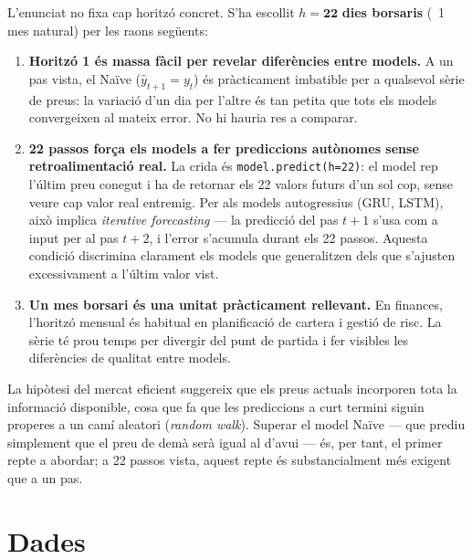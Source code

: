 \documentclass[12pt,a4paper]{article}
\begin{document}
L'enunciat no fixa cap horitzó concret. S'ha escollit $h = \mathbf{22}$ \textbf{dies
borsaris} (~1 mes natural) per les raons següents:

\begin{enumerate}
  \item \textbf{Horitzó 1 és massa fàcil per revelar diferències entre models.}
        A un pas vista, el Naïve ($\hat{y}_{t+1} = y_t$) és pràcticament imbatible
        per a qualsevol sèrie de preus: la variació d'un dia per l'altre és tan petita
        que tots els models convergeixen al mateix error. No hi hauria res a comparar.

  \item \textbf{22 passos força els models a fer prediccions autònomes sense
        retroalimentació real.} La crida és \texttt{model.predict(h=22)}: el model
        rep l'últim preu conegut i ha de retornar els 22 valors futurs d'un sol cop,
        sense veure cap valor real entremig. Per als models autogressius (GRU, LSTM),
        això implica \textit{iterative forecasting} --- la predicció del pas $t+1$
        s'usa com a input per al pas $t+2$, i l'error s'acumula durant els 22 passos.
        Aquesta condició discrimina clarament els models que generalitzen dels que
        s'ajusten excessivament a l'últim valor vist.

  \item \textbf{Un mes borsari és una unitat pràcticament rellevant.}
        En finances, l'horitzó mensual és habitual en planificació de cartera i
        gestió de risc. La sèrie té prou temps per divergir del punt de partida
        i fer visibles les diferències de qualitat entre models.
\end{enumerate}

La hipòtesi del mercat eficient suggereix que els preus actuals incorporen tota la informació
disponible, cosa que fa que les prediccions a curt termini siguin properes a un camí aleatori
(\textit{random walk}). Superar el model Naïve --- que prediu simplement que el preu
de demà serà igual al d'avui --- és, per tant, el primer repte a abordar; a 22 passos
vista, aquest repte és substancialment més exigent que a un pas.

\section{Dades}
\end{document}
